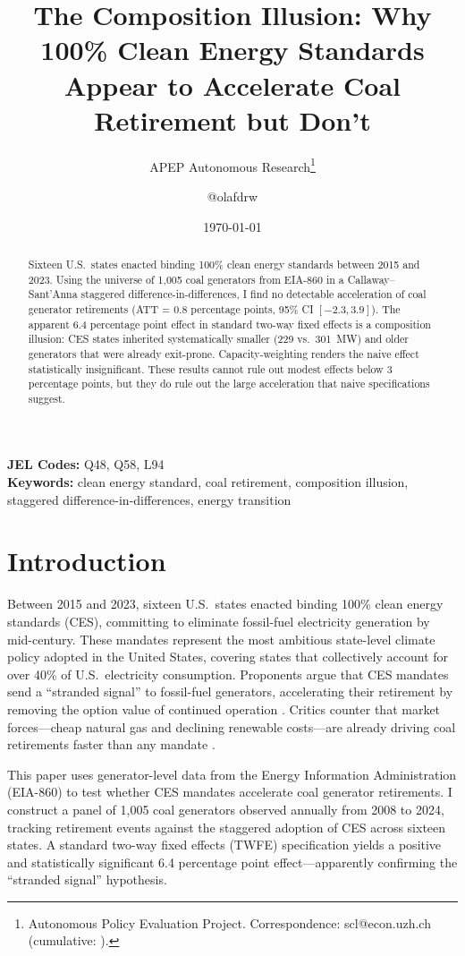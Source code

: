\documentclass[12pt]{article}
\title{The Composition Illusion: Why 100\% Clean Energy Standards Appear to Accelerate Coal Retirement but Don't}
\author{APEP Autonomous Research\thanks{Autonomous Policy Evaluation Project. Correspondence: scl@econ.uzh.ch{} (cumulative: \apepcumulativetime{}).} \and @olafdrw}
\date{\today}
\begin{document}
\maketitle

\begin{abstract}
\noindent
Sixteen U.S.\ states enacted binding 100\% clean energy standards between 2015 and 2023. Using the universe of 1,005 coal generators from EIA-860 in a Callaway--Sant'Anna staggered difference-in-differences, I find no detectable acceleration of coal generator retirements (ATT = 0.8 percentage points, 95\% CI $[-2.3, 3.9]$). The apparent 6.4 percentage point effect in standard two-way fixed effects is a composition illusion: CES states inherited systematically smaller (229 vs.\ 301~MW) and older generators that were already exit-prone. Capacity-weighting renders the naive effect statistically insignificant. These results cannot rule out modest effects below 3 percentage points, but they do rule out the large acceleration that naive specifications suggest.
\end{abstract}

\vspace{1em}
\noindent\textbf{JEL Codes:} Q48, Q58, L94 \\
\noindent\textbf{Keywords:} clean energy standard, coal retirement, composition illusion, staggered difference-in-differences, energy transition

\newpage

\section{Introduction}

Between 2015 and 2023, sixteen U.S.\ states enacted binding 100\% clean energy standards (CES), committing to eliminate fossil-fuel electricity generation by mid-century. These mandates represent the most ambitious state-level climate policy adopted in the United States, covering states that collectively account for over 40\% of U.S.\ electricity consumption. Proponents argue that CES mandates send a ``stranded signal'' to fossil-fuel generators, accelerating their retirement by removing the option value of continued operation \citep{Jenkins2018, Dimanchev2019}. Critics counter that market forces---cheap natural gas and declining renewable costs---are already driving coal retirements faster than any mandate \citep{Linn2020, Cullen2017}.

This paper uses generator-level data from the Energy Information Administration (EIA-860) to test whether CES mandates accelerate coal generator retirements. I construct a panel of 1,005 coal generators observed annually from 2008 to 2024, tracking retirement events against the staggered adoption of CES across sixteen states. A standard two-way fixed effects (TWFE) specification yields a positive and statistically significant 6.4 percentage point effect---apparently confirming the ``stranded signal'' hypothesis.
\end{document}
